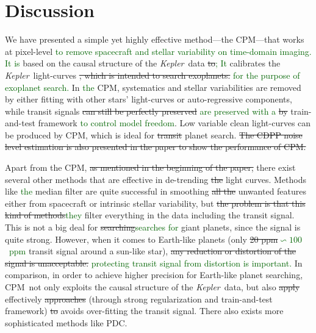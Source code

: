 \documentclass[12pt, preprint]{aastex}
\newcommand{\project}[1]{\textsl{#1}}
\newcommand{\Kepler}{\project{Kepler}}
\newcommand{\name}{CPM}
\newcommand{\revise}[1]{\textcolor{darkgreen}{#1}}
\newcommand{\remove}[1]{\sout{#1}}
\begin{document}
\section{Discussion}
We have presented a simple yet highly effective method---the \name---that works at pixel-level \revise{to remove spacecraft and stellar variability on time-domain imaging. It is} based on the causal structure of the \Kepler\ data \remove{to}\revise{; It} calibrates the \Kepler\ light-curves \remove{, which is intended to search exoplanets.} \revise{for the purpose of exoplanet search.}
In \revise{the} \name, systematics and stellar variabilities are removed by either fitting with other stars' light-curves or auto-regressive components, while transit signals \remove{can still be perfectly preserved} \revise{are preserved with a} \remove{by} train-and-test framework \revise{to control model freedom}.
Low variable clean light-curves can be produced by \name,  
  which is ideal for \remove{transit} planet search. 
\remove{The CDPP noise level estimation is also presented in the paper to show the performance of \name.} 

Apart from the \name, \remove{as mentioned in the beginning of the paper,}
  there exist several other methods that are effective in de-trending \remove{the} light curves.
Methods like \revise{the} median filter are quite successful in smoothing \remove{all the} unwanted features 
  either from spacecraft or intrinsic stellar variability, 
  but \remove{the problem is that this kind of methods}\revise{they} filter everything in the data including the transit signal. 
This is not a big deal for \remove{searching}\revise{searches for} giant planets, since the signal is quite strong. 
However, 
  when it comes to Earth-like planets (only \remove{20 ppm}\revise{$\backsim 100$\ ppm} transit signal around a sun-like star),
  \remove{any reduction or distortion of the signal is unacceptable.}
  \revise{protecting transit signal from distortion is important.} 
In comparison, in order to achieve higher precision for Earth-like planet searching, 
  \name\  not only exploits the causal structure of the \Kepler\ data,
  but also \remove{apply} effectively \remove{approaches} (through strong regularization and train-and-test framework)
  \remove{to} avoids over-fitting the transit signal.
There also exists more sophisticated methods like PDC.
\end{document}
